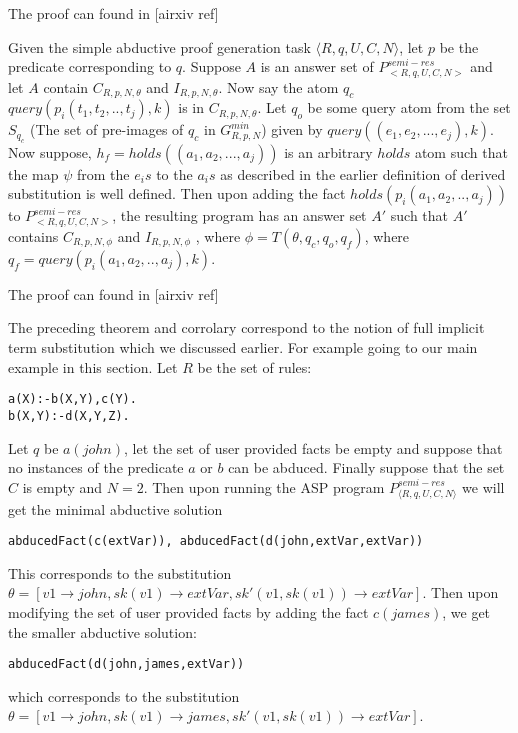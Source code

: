 The proof can found in [airxiv ref]


%


\begin{corollary}\label{thm:addfact}
Given the simple abductive proof generation task $\langle R,q,U,C,N\rangle$, let $p$ be the predicate corresponding to $q$. Suppose $A$ is an answer set of $P^{semi-res}_{<R,q,U,C,N>}$ and let $A$ contain $C_{R,p,N,\theta}$ and $I_{R,p,N,\theta}$. Now say the atom $q_{c}$ $query(p_{i}(t_{1},t_{2},..,t_{j}),k)$ is in $C_{R,p,N,\theta}$. Let $q_{o}$ be some query atom from the set $S_{q_{c}}$ (The set of pre-images of $q_{c}$ in $G_{R,p,N}^{min}$) given by $query((e_{1},e_{2},...,e_{j}),k)$. Now suppose, $h_{f}= holds((a_{1},a_{2},...,a_{j}))$ is an arbitrary $holds$ atom such that the map $\psi$ from the $e_{i}s$ to the $a_{i}s$ as described in the earlier definition of derived substitution is well defined. Then upon adding the fact $holds(p_{i}(a_{1},a_{2},..,a_{j}))$ to $P^{semi-res}_{<R,q,U,C,N>}$, the resulting program has an answer set $A'$ such that $A'$ contains $C_{R,p,N,\phi}$ and $I_{R,p,N,\phi}$ , where $\phi = T(\theta, q_{c}, q_{o}, q_{f})$, where $q_{f} = query(p_{i}(a_{1},a_{2},..,a_{j}),k)$. 
\end{corollary}

The proof can found in [airxiv ref]



The preceding theorem and corrolary correspond to the notion of full implicit term substitution which we discussed earlier. For example going to our main example in this section. Let $R$ be the set of rules:\begin{lstlisting}[frame=none]
a(X):-b(X,Y),c(Y).
b(X,Y):-d(X,Y,Z).
\end{lstlisting}

Let $q$ be $a(john)$, let the set of user provided facts be empty and suppose that no instances of the predicate $a$ or $b$ can be abduced. Finally suppose that the set $C$ is empty and $N=2$. Then upon running the ASP program $P_{\langle R,q,U,C,N\rangle}^{semi-res}$ we will get the minimal abductive solution \begin{lstlisting}[frame=none]
abducedFact(c(extVar)), abducedFact(d(john,extVar,extVar))
\end{lstlisting} 
This corresponds to the substitution $\theta =[v1\rightarrow john,sk(v1) \rightarrow extVar, sk'(v1,sk(v1))\rightarrow extVar]$. Then upon modifying the set of user provided facts by adding the fact $c(james)$, we get the smaller abductive solution:
\begin{lstlisting}[frame=none]
abducedFact(d(john,james,extVar))
\end{lstlisting} which corresponds to the substitution $\theta =[v1\rightarrow john,sk(v1) \rightarrow james, sk'(v1,sk(v1))\rightarrow extVar]$. 

